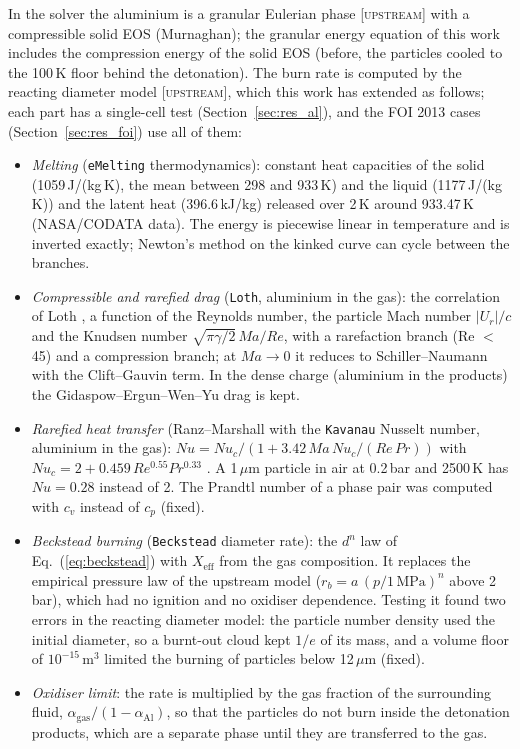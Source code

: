 \documentclass{article}
\newcommand{\up}{\textsc{[upstream]}}
\begin{document}
In the solver the aluminium is a granular Eulerian phase \up{} with a compressible solid EOS (Murnaghan); the granular energy equation of this work includes the compression energy of the solid EOS (before, the particles cooled to the 100\,K floor behind the detonation). The burn rate is computed by the reacting diameter model \up, which this work has extended as follows; each part has a single-cell test (Section~\ref{sec:res_al}), and the FOI 2013 cases (Section~\ref{sec:res_foi}) use all of them:
\begin{itemize}
    \item \emph{Melting} (\texttt{eMelting} thermodynamics): constant heat capacities of the solid (1059\,J/(kg\,K), the mean between 298 and 933\,K) and the liquid (1177\,J/(kg\,K)) and the latent heat (396.6\,kJ/kg) released over 2\,K around 933.47\,K (NASA/CODATA data). The energy is piecewise linear in temperature and is inverted exactly; Newton's method on the kinked curve can cycle between the branches.
    \item \emph{Compressible and rarefied drag} (\texttt{Loth}, aluminium in the gas): the correlation of Loth \cite{loth}, a function of the Reynolds number, the particle Mach number $|U_r|/c$ and the Knudsen number $\sqrt{\pi\gamma/2}\,Ma/Re$, with a rarefaction branch (Re $<$ 45) and a compression branch; at $Ma \to 0$ it reduces to Schiller--Naumann with the Clift--Gauvin term. In the dense charge (aluminium in the products) the Gidaspow--Ergun--Wen--Yu drag is kept.
    \item \emph{Rarefied heat transfer} (Ranz--Marshall with the \texttt{Kavanau} Nusselt number, aluminium in the gas): $Nu = Nu_c/(1 + 3.42\,Ma\,Nu_c/(Re\,Pr))$ with $Nu_c = 2 + 0.459\,Re^{0.55}Pr^{0.33}$ \cite{kavanau}. A 1\,$\mu$m particle in air at 0.2\,bar and 2500\,K has $Nu = 0.28$ instead of 2. The Prandtl number of a phase pair was computed with $c_v$ instead of $c_p$ (fixed).
    \item \emph{Beckstead burning} (\texttt{Beckstead} diameter rate): the $d^n$ law of Eq.~(\ref{eq:beckstead}) with $X_\text{eff}$ from the gas composition. It replaces the empirical pressure law of the upstream model ($r_b = a\,(p/1\,\text{MPa})^n$ above 2\,bar), which had no ignition and no oxidiser dependence. Testing it found two errors in the reacting diameter model: the particle number density used the initial diameter, so a burnt-out cloud kept $1/e$ of its mass, and a volume floor of $10^{-15}\,\text{m}^3$ limited the burning of particles below 12\,$\mu$m (fixed).
    \item \emph{Oxidiser limit}: the rate is multiplied by the gas fraction of the surrounding fluid, $\alpha_\text{gas}/(1 - \alpha_\text{Al})$, so that the particles do not burn inside the detonation products, which are a separate phase until they are transferred to the gas.

\end{itemize}
\end{document}
